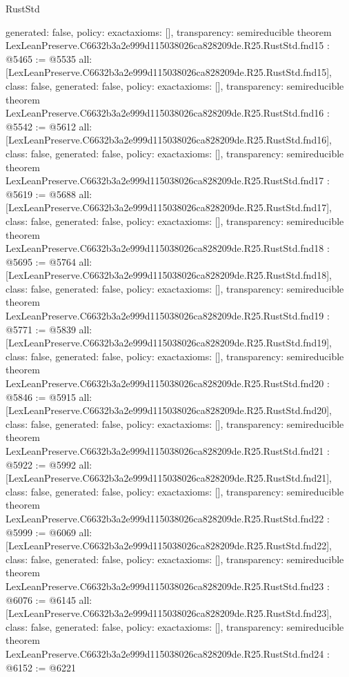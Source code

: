 \begin{lexlean}{RustStd}
\begin{coremodule}
{  generated: false,
  policy: exact{axioms: []},
  transparency: semireducible
}
theorem LexLeanPreserve.C6632b3a2e999d115038026ca828209de.R25.RustStd.fnd15 : @5465 := @5535 {
  all: [LexLeanPreserve.C6632b3a2e999d115038026ca828209de.R25.RustStd.fnd15],
  class: false,
  generated: false,
  policy: exact{axioms: []},
  transparency: semireducible
}
theorem LexLeanPreserve.C6632b3a2e999d115038026ca828209de.R25.RustStd.fnd16 : @5542 := @5612 {
  all: [LexLeanPreserve.C6632b3a2e999d115038026ca828209de.R25.RustStd.fnd16],
  class: false,
  generated: false,
  policy: exact{axioms: []},
  transparency: semireducible
}
theorem LexLeanPreserve.C6632b3a2e999d115038026ca828209de.R25.RustStd.fnd17 : @5619 := @5688 {
  all: [LexLeanPreserve.C6632b3a2e999d115038026ca828209de.R25.RustStd.fnd17],
  class: false,
  generated: false,
  policy: exact{axioms: []},
  transparency: semireducible
}
theorem LexLeanPreserve.C6632b3a2e999d115038026ca828209de.R25.RustStd.fnd18 : @5695 := @5764 {
  all: [LexLeanPreserve.C6632b3a2e999d115038026ca828209de.R25.RustStd.fnd18],
  class: false,
  generated: false,
  policy: exact{axioms: []},
  transparency: semireducible
}
theorem LexLeanPreserve.C6632b3a2e999d115038026ca828209de.R25.RustStd.fnd19 : @5771 := @5839 {
  all: [LexLeanPreserve.C6632b3a2e999d115038026ca828209de.R25.RustStd.fnd19],
  class: false,
  generated: false,
  policy: exact{axioms: []},
  transparency: semireducible
}
theorem LexLeanPreserve.C6632b3a2e999d115038026ca828209de.R25.RustStd.fnd20 : @5846 := @5915 {
  all: [LexLeanPreserve.C6632b3a2e999d115038026ca828209de.R25.RustStd.fnd20],
  class: false,
  generated: false,
  policy: exact{axioms: []},
  transparency: semireducible
}
theorem LexLeanPreserve.C6632b3a2e999d115038026ca828209de.R25.RustStd.fnd21 : @5922 := @5992 {
  all: [LexLeanPreserve.C6632b3a2e999d115038026ca828209de.R25.RustStd.fnd21],
  class: false,
  generated: false,
  policy: exact{axioms: []},
  transparency: semireducible
}
theorem LexLeanPreserve.C6632b3a2e999d115038026ca828209de.R25.RustStd.fnd22 : @5999 := @6069 {
  all: [LexLeanPreserve.C6632b3a2e999d115038026ca828209de.R25.RustStd.fnd22],
  class: false,
  generated: false,
  policy: exact{axioms: []},
  transparency: semireducible
}
theorem LexLeanPreserve.C6632b3a2e999d115038026ca828209de.R25.RustStd.fnd23 : @6076 := @6145 {
  all: [LexLeanPreserve.C6632b3a2e999d115038026ca828209de.R25.RustStd.fnd23],
  class: false,
  generated: false,
  policy: exact{axioms: []},
  transparency: semireducible
}
theorem LexLeanPreserve.C6632b3a2e999d115038026ca828209de.R25.RustStd.fnd24 : @6152 := @6221 {
}
\end{coremodule}
\end{lexlean}
